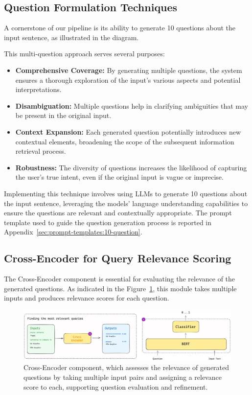 \subsection{Question Formulation Techniques}\label{subsec:question-formulation-techniques}
A cornerstone of our pipeline is its ability to generate 10 questions about the input sentence, as illustrated in the diagram.

This multi-question approach serves several purposes:
\begin{itemize}
    \item \textbf{Comprehensive Coverage:} By generating multiple questions, the system ensures a thorough exploration of the input's various aspects and potential interpretations.
    \item \textbf{Disambiguation:} Multiple questions help in clarifying ambiguities that may be present in the original input.
    \item \textbf{Context Expansion:} Each generated question potentially introduces new contextual elements, broadening the scope of the subsequent information retrieval process.
    \item \textbf{Robustness:} The diversity of questions increases the likelihood of capturing the user's true intent, even if the original input is vague or imprecise.
\end{itemize}

Implementing this technique involves using \ac{LLMs} to generate 10 questions about the input sentence, leveraging the models’ language understanding capabilities to ensure the questions are relevant and contextually appropriate.
The prompt template used to guide the question generation process is reported in Appendix~\ref{sec:prompt-templates:10-question}.

\subsection{Cross-Encoder for Query Relevance Scoring}\label{subsec:cross-encoder-for-query-relevance-scoring}
The Cross-Encoder component is essential for evaluating the relevance of the generated questions.
As indicated in the Figure~\ref{fig:cross-encoder-articture}, this module takes multiple inputs and produces relevance scores for each question.

\begin{figure}[ht!]
    \centering
    \begin{minipage}[b]{\textwidth}
        \centering
        \includegraphics[width=\textwidth]{res/Cross-Encoder}
    \end{minipage}
    \caption{Cross-Encoder component, which assesses the relevance of generated questions by taking multiple input pairs and assigning a relevance score to each, supporting question evaluation and refinement.}
    \label{fig:cross-encoder-articture}
\end{figure}

